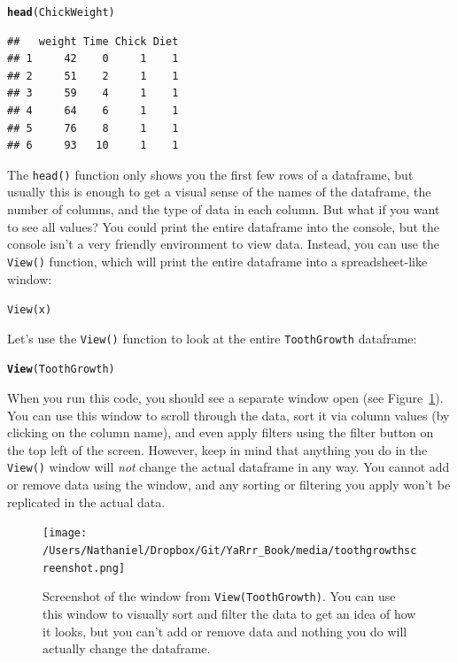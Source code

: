 \documentclass{tufte-book}\usepackage[]{graphicx}\usepackage[]{color}
\makeatletter
\newcommand{\hlstd}[1]{\textcolor[rgb]{0.345,0.345,0.345}{#1}}%
\newcommand{\hlkwd}[1]{\textcolor[rgb]{0.737,0.353,0.396}{\textbf{#1}}}%
\newenvironment{kframe}{%
 \def\at@end@of@kframe{}%
 \ifinner\ifhmode%
  \def\at@end@of@kframe{\end{minipage}}%
  \begin{minipage}{\columnwidth}%
 \fi\fi%
 \def\FrameCommand##1{\hskip\@totalleftmargin \hskip-\fboxsep
 \colorbox{shadecolor}{##1}\hskip-\fboxsep
     \hskip-\linewidth \hskip-\@totalleftmargin \hskip\columnwidth}%
 \MakeFramed {\advance\hsize-\width
   \@totalleftmargin\z@ \linewidth\hsize
   \@setminipage}}%
 {\par\unskip\endMakeFramed%
 \at@end@of@kframe}
\newenvironment{knitrout}{}{} %
\newcommand{\newfun}[1]{\begin{LARGE} \begin{center} \texttt{#1} \end{center} \end{LARGE}}
\makeatother
\begin{document}
\begin{footnotesize}
\begin{knitrout}
\color{fgcolor}\begin{kframe}
\begin{alltt}
\hlkwd{head}\hlstd{(ChickWeight)}
\end{alltt}
\begin{verbatim}
##   weight Time Chick Diet
## 1     42    0     1    1
## 2     51    2     1    1
## 3     59    4     1    1
## 4     64    6     1    1
## 5     76    8     1    1
## 6     93   10     1    1
\end{verbatim}
\end{kframe}
\end{knitrout}

The \texttt{head()} function only shows you the first few rows of a dataframe, but usually this is enough to get a visual sense of the names of the dataframe, the number of columns, and the type of data in each column. But what if you want to see all values? You could print the entire dataframe into the console, but the console isn't a very friendly environment to view data. Instead, you can use the \texttt{View()} function, which will print the entire dataframe into a spreadsheet-like window:

\newfun{View(x)}

Let's use the \texttt{View()} function to look at the entire \texttt{ToothGrowth} dataframe:

\begin{knitrout}
\color{fgcolor}\begin{kframe}
\begin{alltt}
\hlkwd{View}\hlstd{(ToothGrowth)}
\end{alltt}
\end{kframe}
\end{knitrout}

When you run this code, you should see a separate window open (see Figure~\ref{fig:toothgrowthscreenshot}). You can use this window to scroll through the data, sort it via column values (by clicking on the column name), and even apply filters using the filter button on the top left of the screen. However, keep in mind that anything you do in the \texttt{View()} window will \textit{not} change the actual dataframe in any way. You cannot add or remove data using the window, and any sorting or filtering you apply won't be replicated in the actual data.

\begin{figure}[h]
\texttt{[image: /Users/Nathaniel/Dropbox/Git/YaRrr\_Book/media/toothgrowthscreenshot.png]}
\label{fig:toothgrowthscreenshot}
\caption{Screenshot of the window from \texttt{View(ToothGrowth)}. You can use this window to visually sort and filter the data to get an idea of how it looks, but you can't add or remove data and nothing you do will actually change the dataframe.}
\end{figure}


\end{footnotesize}
\end{document}
